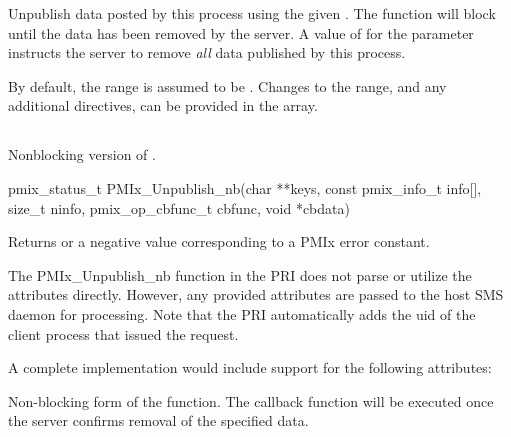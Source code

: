 

\descr

Unpublish data posted by this process using the given .
The function will block until the data has been removed by the server.
A value of  for the  parameter instructs the server to remove \emph{all} data published by this process.

By default, the range is assumed to be .
Changes to the range, and any additional directives, can be provided in the  array.


\subsection{}

\summary

Nonblocking version of .

\format

\cspecificstart
\begin{codepar}
pmix_status_t
PMIx_Unpublish_nb(char **keys,
                  const pmix_info_t info[], size_t ninfo,
                  pmix_op_cbfunc_t cbfunc, void *cbdata)
\end{codepar}
\cspecificend

\begin{arglist}
\end{arglist}

Returns  or a negative value corresponding to a PMIx error constant.

\priattr
The PMIx_Unpublish_nb function in the \ac{PRI} does not parse or utilize the attributes directly. However, any provided attributes are passed to the host \ac{SMS} daemon for processing. Note that the \ac{PRI} automatically adds the uid of the client process that issued the request.

\optattr
A complete implementation would include support for the following attributes:


\descr

Non-blocking form of the  function.
The callback function will be executed once the server confirms removal of the specified data.




